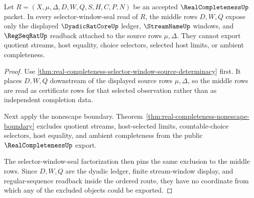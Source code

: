 \begin{theorem}
\label{thm:real-completeness-selector-window-dyadic-window-nonescape}
Let $R=(X,\mu,\Delta,D,W,Q,S,H,C,P,N)$ be an accepted $\RealCompletenessUp$ packet. In every selector-window-seal read of $R$, the middle rows $D,W,Q$ expose only the displayed $\DyadicRatCoreUp$ ledger, $\StreamNameUp$ windows, and $\RegSeqRatUp$ readback attached to the source rows $\mu,\Delta$. They cannot export quotient streams, host equality, choice selectors, selected host limits, or ambient completeness.
\end{theorem}
\begin{proof}
Use \autoref{thm:real-completeness-selector-window-source-determinacy} first. It places $D,W,Q$ downstream of the displayed source rows $\mu,\Delta$, so the middle rows are read as certificate rows for that selected observation rather than as independent completion data.

Next apply the nonescape boundary. Theorem~\ref{thm:real-completeness-nonescape-boundary} excludes quotient streams, host-selected limits, countable-choice selectors, host equality, and ambient completeness from the public $\RealCompletenessUp$ export.

The selector-window-seal factorization then pins the same exclusion to the middle rows. Since $D,W,Q$ are the dyadic ledger, finite stream-window display, and regular-sequence readback inside the ordered route, they have no coordinate from which any of the excluded objects could be exported.
\end{proof}

